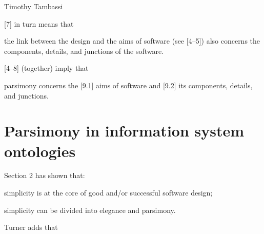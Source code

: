 \begin{artengenv}{Timothy Tambassi}
\begin{enumerate}[label={[\arabic*]}]
\end{enumerate}

[7] in turn means that



\setcounter{saveenumtambassi}{\value{enumi}}

\begin{enumerate}[label={[\arabic*]}]

\setcounter{enumi}{\value{saveenumtambassi}}

\item the link between the design and the aims of software (see [4–5]) also concerns the components, details, and junctions of the software.

\end{enumerate}

[4–8] (together) imply that



\setcounter{saveenumtambassi}{\value{enumi}}

\begin{enumerate}[label={[\arabic*]}]

\setcounter{enumi}{\value{saveenumtambassi}}

\item parsimony concerns the [9.1] aims of software and [9.2] its components, details, and junctions.

\end{enumerate}

\section{Parsimony in information system ontologies}

Section 2 has shown that:

\enlargethispage{1.5\baselineskip}

\setcounter{saveenumtambassi}{\value{enumi}}

\begin{enumerate}[label={[\arabic*]}]

\setcounter{enumi}{\value{saveenumtambassi}}

\item simplicity is at the core of good and/or successful software design;

\item simplicity can be divided into elegance and parsimony.

\end{enumerate}

Turner
\parencite*[][p.128]{turner_computational_2018}
 adds that




\end{artengenv}
